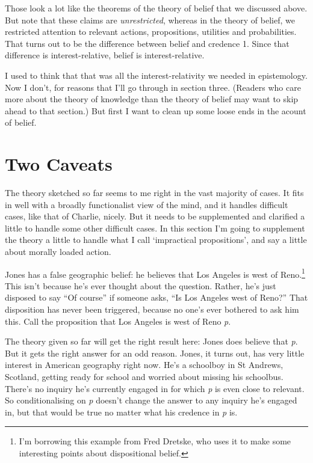 \documentclass[
  11pt,
  letterpaper,
  DIV=11,
  numbers=noendperiod,
  twoside]{scrartcl}
\begin{document}
Those look a lot like the theorems of the theory of belief that we
discussed above. But note that these claims are \emph{unrestricted},
whereas in the theory of belief, we restricted attention to relevant
actions, propositions, utilities and probabilities. That turns out to be
the difference between belief and credence 1. Since that difference is
interest-relative, belief is interest-relative.

I used to think that that was all the interest-relativity we needed in
epistemology. Now I don't, for reasons that I'll go through in section
three. (Readers who care more about the theory of knowledge than the
theory of belief may want to skip ahead to that section.) But first I
want to clean up some loose ends in the acount of belief.

\section{Two Caveats}\label{two-caveats}

The theory sketched so far seems to me right in the vast majority of
cases. It fits in well with a broadly functionalist view of the mind,
and it handles difficult cases, like that of Charlie, nicely. But it
needs to be supplemented and clarified a little to handle some other
difficult cases. In this section I'm going to supplement the theory a
little to handle what I call `impractical propositions', and say a
little about morally loaded action.

Jones has a false geographic belief: he believes that Los Angeles is
west of Reno.\footnote{I'm borrowing this example from Fred Dretske, who
  uses it to make some interesting points about dispositional belief.}
This isn't because he's ever thought about the question. Rather, he's
just disposed to say ``Of course'' if someone asks, ``Is Los Angeles
west of Reno?'' That disposition has never been triggered, because no
one's ever bothered to ask him this. Call the proposition that Los
Angeles is west of Reno \emph{p}.

The theory given so far will get the right result here: Jones does
believe that \emph{p}. But it gets the right answer for an odd reason.
Jones, it turns out, has very little interest in American geography
right now. He's a schoolboy in St Andrews, Scotland, getting ready for
school and worried about missing his schoolbus. There's no inquiry he's
currently engaged in for which \emph{p} is even close to relevant. So
conditionalising on \emph{p} doesn't change the answer to any inquiry
he's engaged in, but that would be true no matter what his credence in
\emph{p} is.
\end{document}
